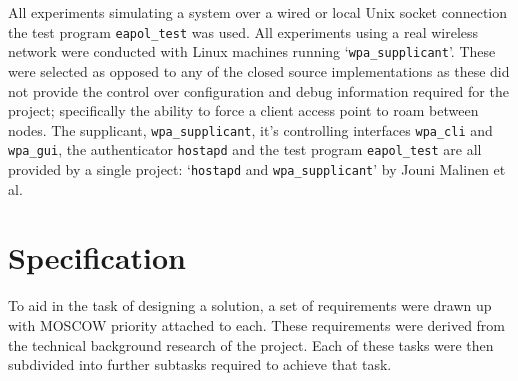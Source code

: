 \documentclass[pdftex, 12pt, a4paper]{article}
\begin{document}
All experiments simulating a system over a wired or local Unix socket connection the test program \verb`eapol_test` was used. All experiments using a real wireless network were conducted with Linux machines running `\verb`wpa_supplicant`'. These were selected as opposed to any of the closed source implementations as these did not provide the control over configuration and debug information required for the project; specifically the ability to force a client access point to roam between nodes.  The supplicant, \verb`wpa_supplicant`, it's controlling interfaces \verb`wpa_cli` and \verb`wpa_gui`, the authenticator \verb`hostapd` and the test program \verb`eapol_test` are all provided by a single project: `\verb`hostapd` and \verb`wpa_supplicant`' by Jouni Malinen et al\cite{wpa-hostapd}.

\section{Specification}
To aid in the task of designing a solution, a set of  requirements were drawn up with MOSCOW priority attached to each. These requirements were derived from the technical background research of the project.  Each of these tasks were then subdivided into further subtasks required to achieve that task.
\end{document}
